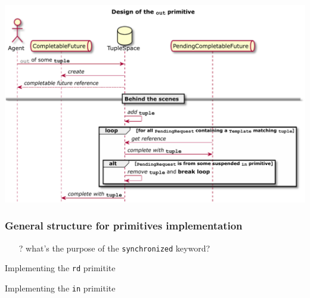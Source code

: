 \documentclass[presentation]{beamer}\mode<presentation>{\usetheme{AMSCesenaPurpleAndGold}}
\begin{document}
\begin{frame}

\begin{center}
	\includegraphics[width=\linewidth]{./img/out-design.pdf}
\end{center}

\end{frame}

\begin{frame}
\frametitle{General structure for primitives implementation}



\begin{itemize}
	\item[?] what's the purpose of the \texttt{\alert{synchronized}} keyword?
\end{itemize}

\end{frame}

\begin{frame}[allowframebreaks]{Implementing the \texttt{rd} primitite}
	
\end{frame}

\begin{frame}[allowframebreaks]{Implementing the \texttt{in} primitite}

\end{frame}

\section*{}
\end{document}
